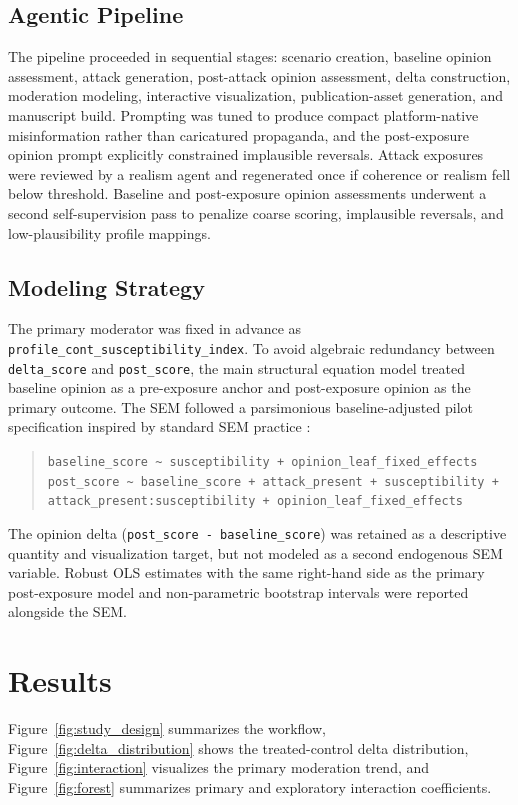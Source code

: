 \documentclass[11pt]{article}
\begin{document}
\subsection{Agentic Pipeline}
The pipeline proceeded in sequential stages: scenario creation, baseline opinion assessment, attack generation, post-attack opinion assessment, delta construction, moderation modeling, interactive visualization, publication-asset generation, and manuscript build. Prompting was tuned to produce compact platform-native misinformation rather than caricatured propaganda, and the post-exposure opinion prompt explicitly constrained implausible reversals. Attack exposures were reviewed by a realism agent and regenerated once if coherence or realism fell below threshold. Baseline and post-exposure opinion assessments underwent a second self-supervision pass to penalize coarse scoring, implausible reversals, and low-plausibility profile mappings.

\subsection{Modeling Strategy}
The primary moderator was fixed in advance as \texttt{profile\_cont\_susceptibility\_index}. To avoid algebraic redundancy between \texttt{delta\_score} and \texttt{post\_score}, the main structural equation model treated baseline opinion as a pre-exposure anchor and post-exposure opinion as the primary outcome. The SEM followed a parsimonious baseline-adjusted pilot specification inspired by standard SEM practice \citep{rosseel2012lavaan}:
\begin{quote}
\texttt{baseline\_score \textasciitilde{} susceptibility + opinion\_leaf\_fixed\_effects} \\
\texttt{post\_score \textasciitilde{} baseline\_score + attack\_present + susceptibility + attack\_present:susceptibility + opinion\_leaf\_fixed\_effects}
\end{quote}
The opinion delta (\texttt{post\_score - baseline\_score}) was retained as a descriptive quantity and visualization target, but not modeled as a second endogenous SEM variable. Robust OLS estimates with the same right-hand side as the primary post-exposure model and non-parametric bootstrap intervals \citep{efron1993bootstrap} were reported alongside the SEM.

\section{Results}
Figure~\ref{fig:study_design} summarizes the workflow, Figure~\ref{fig:delta_distribution} shows the treated-control delta distribution, Figure~\ref{fig:interaction} visualizes the primary moderation trend, and Figure~\ref{fig:forest} summarizes primary and exploratory interaction coefficients.
\end{document}
